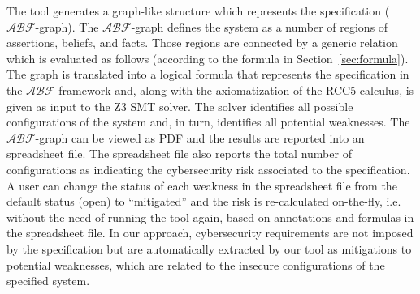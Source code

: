 \documentclass[runningheads]{llncs}
\newcommand{\assertionRegion}{\mathcal{A}}
\newcommand{\beliefRegion}{\mathcal{B}}
\newcommand{\factRegion}{\mathcal{F}}
\newcommand{\abftheory}{\assertionRegion\beliefRegion\factRegion}
\begin{document}
The tool generates a graph-like structure which represents
the specification ($\abftheory$-graph). The $\abftheory$-graph defines the system as
a number of regions of assertions, beliefs, and facts. Those regions
are connected by a generic relation which is evaluated as follows (according to
the formula in Section~\ref{sec:formula}).
The graph is translated into 
a logical formula that represents the specification in the $\abftheory$-framework and,
along with the axiomatization of the RCC5 calculus, is given as input to the Z3 SMT solver.
The solver identifies all possible configurations of the system and, in turn,
identifies all potential weaknesses. 
The $\abftheory$-graph can be viewed as PDF and the results are reported into an spreadsheet file.
The spreadsheet file also reports the total number of configurations as indicating
the cybersecurity risk associated to the specification. A user can change the status
of each weakness in the spreadsheet file from the default status (open)
to ``mitigated'' and the risk is re-calculated on-the-fly, i.e.
without the need of running the tool again, based on annotations and formulas 
in the spreadsheet file.
In our approach, cybersecurity requirements are not imposed by the
specification but are automatically extracted by our tool as mitigations to potential weaknesses,
which are related to the insecure configurations 
of the specified system. 
\end{document}
